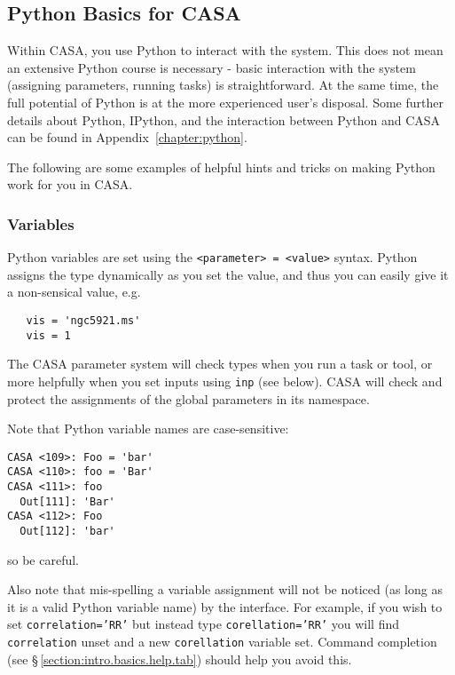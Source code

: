 \subsection{Python Basics for CASA}
\label{section:intro.basics.python}

Within CASA, you use Python to interact with the system.  This does
not mean an extensive Python course is necessary - basic interaction
with the system (assigning parameters, running tasks) is
straightforward.  At the same time, the full potential of Python is at
the more experienced user's disposal.  Some further details about
Python, IPython, and the interaction between Python and CASA can be
found in Appendix~\ref{chapter:python}.

The following are some examples of helpful hints and tricks on making
Python work for you in CASA.

\subsubsection{Variables}
\label{section:intro.basics.python.var}

Python variables are set using the {\tt <parameter> = <value>} 
syntax.  Python assigns the type dynamically as you set the value,
and thus you can easily give it a non-sensical value, e.g. 
\small
\begin{verbatim}
   vis = 'ngc5921.ms'
   vis = 1
\end{verbatim}
\normalsize
The CASA parameter system will check types when you run a task or
tool, or more helpfully when you set inputs using {\tt inp} (see
below).  CASA will check and protect the assignments of the global
parameters in its namespace.

Note that Python variable names are case-sensitive:
\small
\begin{verbatim}
CASA <109>: Foo = 'bar'
CASA <110>: foo = 'Bar'
CASA <111>: foo
  Out[111]: 'Bar'
CASA <112>: Foo
  Out[112]: 'bar'
\end{verbatim}
\normalsize
so be careful.  

Also note that mis-spelling a variable assignment
will not be noticed (as long as it is a valid Python variable name)
by the interface.  For example, if you wish to set 
{\tt correlation='RR'} but instead type {\tt corellation='RR'}
you will find {\tt correlation} unset and a new {\tt corellation}
variable set.  Command completion (see
\S\,\ref{section:intro.basics.help.tab}) should help you avoid this.

